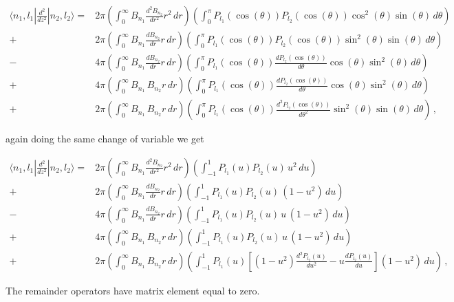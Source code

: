 \documentclass[12pt,a4paper]{article}
\newcommand{\ddz}[1]{\frac{d^2{#1}}{dz^2}}
\newcommand{\dr}[1]{\frac{d{#1}}{dr}}
\newcommand{\ddr}[1]{\frac{d^2{#1}}{dr^2}}
\newcommand{\dt}[1]{\frac{d{#1}}{d\theta}}
\newcommand{\ddt}[1]{\frac{d^2{#1}}{d\theta^2}}
\newcommand{\ct}{\cos(\theta)}
\newcommand{\cct}{\cos^2(\theta)}
\newcommand{\st}{\sin(\theta)}
\newcommand{\sst}{\sin^2(\theta)}
\begin{document}
\begin{equation}
\begin{split}
\langle n_1,l_1|\ddz{}|n_2,l_2\rangle =& 2\pi\left(\int_0^{\infty}B_{n_1}\ddr{B_{n_2}}r^2\,dr\right)
                                             \left(\int_0^{\pi} P_{l_1}(\ct)P_{l_2}(\ct)\cct\st\,d\theta\right) \\
                                      +& 2\pi\left(\int_0^{\infty}B_{n_1}\dr{B_{n_2}}r\,dr\right)
                                             \left(\int_0^{\pi} P_{l_1}(\ct)P_{l_2}(\ct)\sst\st\,d\theta\right) \\
                                      -& 4\pi\left(\int_0^{\infty}B_{n_1}\dr{B_{n_2}}r\,dr\right)
                                             \left(\int_0^{\pi} P_{l_1}(\ct)\dt{P_{l_2}(\ct)}\ct\sst\,d\theta\right) \\
                                      +& 4\pi\left(\int_0^{\infty}B_{n_1}\,B_{n_2}r\,dr\right)
                                             \left(\int_0^{\pi} P_{l_1}(\ct)\dt{P_{l_2}(\ct)}\ct\sst\,d\theta\right) \\
                                      +& 2\pi\left(\int_0^{\infty}B_{n_1}\,B_{n_2}r\,dr\right)
                                             \left(\int_0^{\pi} P_{l_1}(\ct)\ddt{P_{l_2}(\ct)}\sst\st\,d\theta\right)\,,
\end{split}
\end{equation}

\noindent again doing the same change of variable we get

\begin{equation}
\begin{split}
\langle n_1,l_1|\ddz{}|n_2,l_2\rangle =& 2\pi\left(\int_0^{\infty}B_{n_1}\ddr{B_{n_2}}r^2\,dr\right)
                                             \left(\int_{-1}^{1} P_{l_1}(u)P_{l_2}(u)\,u^2\,du\right) \\
                                      +& 2\pi\left(\int_0^{\infty}B_{n_1}\dr{B_{n_2}}r\,dr\right)
                                             \left(\int_{-1}^{1} P_{l_1}(u)P_{l_2}(u)\,(1-u^2)\,du\right) \\
                                      -& 4\pi\left(\int_0^{\infty}B_{n_1}\dr{B_{n_2}}r\,dr\right)
                                             \left(\int_{-1}^{1} P_{l_1}(u)P_{l_2}(u)\,u\,(1-u^2)\,du\right) \\
                                      +& 4\pi\left(\int_0^{\infty}B_{n_1}\,B_{n_2}r\,dr\right)
                                             \left(\int_{-1}^{1} P_{l_1}(u)P_{l_2}(u)\,u\,(1-u^2)\,du\right) \\
                                      +& 2\pi\left(\int_0^{\infty}B_{n_1}\,B_{n_2}r\,dr\right)
                                             \left(\int_{-1}^{1} P_{l_1}(u)
                                             \left[(1-u^2)\frac{d^2P_{l_2}(u)}{du^2}-u\frac{dP_{l_2}(u)}{du} \right](1-u^2)\,du\right)\,,
\end{split}
\end{equation}

The remainder operators have matrix element equal to zero.
{}

\end{document}
